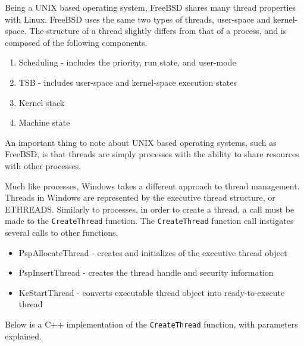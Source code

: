 \documentclass[10pt, onecolumn]{IEEEtran}
\begin{document}
        \vspace{3mm}
        
        Being a UNIX based operating system, FreeBSD shares many thread properties with Linux. FreeBSD uses the same two types of threads, user-space and kernel-space. The structure of a thread slightly differs from that of a process, and is composed of the following components.
        
        \begin{enumerate}
            \item Scheduling - includes the priority, run state, and user-mode
            \item TSB - includes user-space and kernel-space execution states
            \item Kernel stack
            \item Machine state
        \end{enumerate}
    
        An important thing to note about UNIX based operating systems, such as FreeBSD, is that threads are simply processes with the ability to share resources with other processes.
        
        \vspace{3mm}
        
        Much like processes, Windows takes a different approach to thread management. Threads in Windows are represented by the executive thread structure, or ETHREADS\cite{windowspt}. Similarly to processes, in order to create a thread, a call must be made to the \texttt{CreateThread} function. The \texttt{CreateThread} function call instigates several calls to other functions.
        
        \begin{itemize}
            \item PspAllocateThread - creates and initializes of the executive thread object
            \item PspInsertThread - creates the thread handle and security information
            \item KeStartThread - converts executable thread object into ready-to-execute thread
        \end{itemize}
        
        Below is a C++ implementation of the \texttt{CreateThread} function, with parameters explained.
        
                
\end{document}
